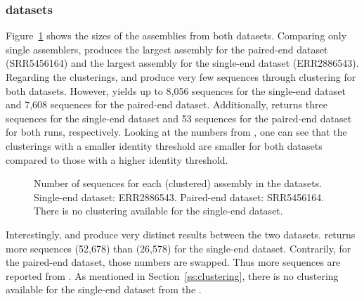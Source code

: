 \documentclass[12pt,a4paper,english]{article}
\begin{document}
\subsubsection*{\celegans datasets}

	    Figure~\ref{img:barcharts:cel} shows the sizes of the assemblies from both \celegans datasets.
		Comparing only single assemblers, \spades produces the largest assembly for the paired-end dataset (SRR5456164) and \soap the largest assembly for the single-end dataset (ERR2886543).
		Regarding the clusterings, \grouper and \karma produce very few sequences through clustering for both datasets. However, \karma yields up to 8,056 sequences for the single-end dataset and 7,608 sequences for the paired-end dataset. Additionally, \grouper returns three sequences for the single-end dataset and 53 sequences for the paired-end dataset for both runs, respectively.
		Looking at the numbers from \cdhit, one can see that the clusterings with a smaller identity threshold are smaller for both datasets compared to those with a higher identity threshold.
		\begin{figure}[H]
			\centering
			\def\svgwidth{\textwidth}
			
			\caption[Number of sequences for each (clustered) assembly in the \celegans datasets.]{Number of sequences for each (clustered) assembly in the \celegans datasets. Single-end dataset: ERR2886543. Paired-end dataset: SRR5456164. There is no \orp clustering available for the single-end dataset.}
			\label{img:barcharts:cel}
		\end{figure}
	\noindent
		Interestingly, \mclust and \mclusttwo produce very distinct results between the two datasets. \mclust returns more sequences (52,678) than \mclusttwo (26,578) for the single-end dataset. Contrarily, for the paired-end dataset, those numbers are swapped. Thus more sequences are reported from \mclusttwo.
		As mentioned in Section~\ref{ss:clustering}, there is no clustering available for the single-end dataset from the \orp.
\end{document}
